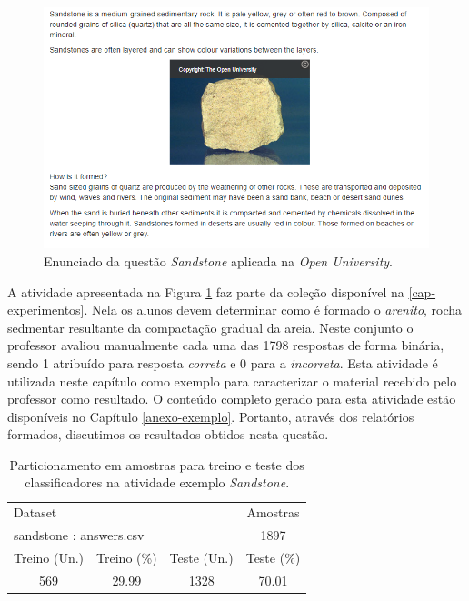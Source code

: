 \begin{figure}[!t]
 \centering
 \includegraphics[width=\textwidth]{figuras/exemplo/sandstone-enunciado.png}
 \caption{Enunciado da questão \textit{Sandstone} aplicada na \textit{Open University}.}
 \label{fig-sandstone-enunciado}
\end{figure}

A atividade apresentada na Figura \ref{fig-sandstone-enunciado} faz parte da coleção disponível na \ref{cap-experimentos}. Nela os alunos devem determinar como é formado o \textit{arenito}, rocha sedmentar resultante da compactação gradual da areia. Neste conjunto o professor avaliou manualmente cada uma das 1798 respostas de forma binária, sendo 1 atribuído para resposta \textit{correta} e 0 para a \textit{incorreta}. Esta atividade é utilizada neste capítulo como exemplo para caracterizar o material recebido pelo professor como resultado. O conteúdo completo gerado para esta atividade estão disponíveis no Capítulo \ref{anexo-exemplo}. Portanto, através dos relatórios formados, discutimos os resultados obtidos nesta questão.


\begin{table}[!b]
\centering
\begin{tabular}{| c c c c |} \hline
\multicolumn{3}{|l}{Dataset} & Amostras\\ 

\multicolumn{3}{|l}{sandstone : answers.csv} & 1897\\ \hline 

 Treino (Un.) & Treino (\%)  & Teste (Un.) & Teste (\%) \\ \hline 

569 & 29.99 & 1328 & 70.01 \\ 

\hline \hline

\end{tabular}
\caption{Particionamento em amostras para treino e teste dos classificadores na atividade exemplo \textit{Sandstone}.}
\label{exemplo-train}
\end{table}

